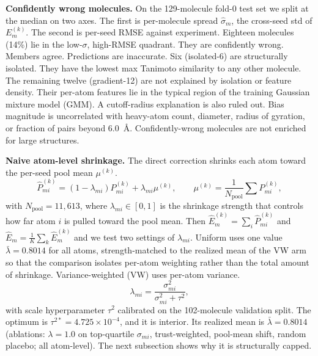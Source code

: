 \documentclass{article}
\begin{document}
\textbf{Confidently wrong molecules.} On the 129-molecule fold-0 test set we
split at the median on two axes. The first is per-molecule spread
$\hat{\sigma}_m$, the cross-seed std of $E_m^{(k)}$. The second is per-seed
RMSE against experiment. Eighteen molecules (14\%) lie in the low-$\sigma$,
high-RMSE quadrant. They are confidently wrong. Members agree. Predictions
are inaccurate. Six (isolated-6) are structurally isolated. They have the
lowest max Tanimoto similarity to any other molecule. The remaining twelve
(gradient-12) are not explained by isolation or feature density. Their
per-atom features lie in the typical region of the training Gaussian mixture model (GMM). A cutoff-radius explanation is also ruled out.
Bias magnitude is uncorrelated with heavy-atom count, diameter, radius of
gyration, or fraction of pairs beyond 6.0~\AA{}. Confidently-wrong molecules
are not enriched for large structures.

\textbf{Naive atom-level shrinkage.} The direct correction shrinks each atom
toward the per-seed pool mean $\mu^{(k)}$.
\begin{equation}
\hat{P}_{mi}^{(k)} = (1-\lambda_{mi})P_{mi}^{(k)} + \lambda_{mi}\mu^{(k)}, \qquad
\mu^{(k)} = \frac{1}{N_{\mathrm{pool}}}\sum P_{mi}^{(k)},
\label{eq:shrink}
\end{equation}
with $N_{\mathrm{pool}}=11{,}613$, where $\lambda_{mi}\in[0,1]$ is the
shrinkage strength that controls how far atom $i$ is pulled toward the pool
mean. Then $\hat{E}_{m}^{(k)}=\sum_i\hat{P}_{mi}^{(k)}$
and $\hat{E}_m=\frac1K\sum_k\hat{E}_m^{(k)}$ and we test two settings of
$\lambda_{mi}$. Uniform uses one value $\bar\lambda=0.8014$ for all atoms,
strength-matched to the realized mean of the VW arm so that the comparison
isolates per-atom weighting rather than the total amount of shrinkage.
Variance-weighted (VW) uses per-atom variance.
\[
\lambda_{mi} = \frac{\sigma_{mi}^2}{\sigma_{mi}^2+\tau^2},
\]
with scale hyperparameter $\tau^2$ calibrated on the 102-molecule validation
split. The optimum is
$\tau^{2*}=4.725\times10^{-4}$, and it is interior. Its realized mean is
$\bar\lambda=0.8014$ (ablations: $\lambda{=}1.0$ on top-quartile $\sigma_{mi}$,
trust-weighted, pool-mean shift, random placebo; all atom-level). The next
subsection shows why it is structurally capped.
\end{document}
